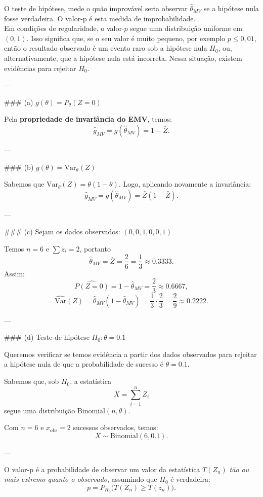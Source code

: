 \documentclass[a4paper]{article}
\begin{document}
\begin{answer}[]
O teste de hipótese, mede o quão improvável seria observar $\hat{\theta}_{MV}$ se a hipótese nula fosse verdadeira. O valor-p é esta medida de improbabilidade.
\\[1em]
Em condições de regularidade, o valor-$p$ segue uma distribuição uniforme em $(0,1)$.
Isso significa que, se o seu valor é muito pequeno, por exemplo $p \leq 0{,}01$,
então o resultado observado é um evento raro sob a hipótese nula $H_0$,
ou, alternativamente, que a hipótese nula está incorreta.
Nessa situação, existem evidências para rejeitar $H_0$.


---

### (a) \( g(\theta) = P_\theta(Z=0) \)

Pela \textbf{propriedade de invariância do EMV}, temos:
\[
\boxed{\hat{g}_{MV} = g(\hat{\theta}_{MV}) = 1 - \bar{Z}.}
\]

---

### (b) \( g(\theta) = \mathrm{Var}_\theta(Z) \)

Sabemos que \( \mathrm{Var}_\theta(Z) = \theta(1 - \theta) \).  
Logo, aplicando novamente a invariância:
\[
\boxed{\hat{g}_{MV} = g(\hat{\theta}_{MV}) = \bar{Z}(1 - \bar{Z}).}
\]

---

### (c) Sejam os dados observados: \( (0, 0, 1, 0, 0, 1) \)

Temos \( n = 6 \) e \( \sum z_i = 2 \), portanto
\[
\hat{\theta}_{MV} = \bar{Z} = \frac{2}{6} = \frac{1}{3} \approx 0.3333.
\]
Assim:
\[
\widehat{P(Z=0)} = 1 - \hat{\theta}_{MV} = \frac{2}{3} \approx 0.6667,
\]
\[
\widehat{\mathrm{Var}}(Z) = \hat{\theta}_{MV}(1 - \hat{\theta}_{MV})
= \frac{1}{3} \cdot \frac{2}{3} = \frac{2}{9} \approx 0.2222.
\]

---

### (d) Teste de hipótese \( H_0: \theta = 0.1 \)

Queremos verificar se temos evidência a partir dos dados observados para rejeitar a hipótese nula 
de que a probabilidade de sucesso é $\theta = 0.1$.

Sabemos que, sob $H_0$, a estatística
\[
X = \sum_{i=1}^{n} Z_i
\]
segue uma distribuição $\text{Binomial}(n, \theta)$.

Com $n = 6$ e $x_{\text{obs}} = 2$ sucessos observados, temos:
\[
X \sim \text{Binomial}(6, 0.1).
\]

---
 
O valor-p é a probabilidade de observar um valor da estatística $T(Z_n)$ 
\textit{tão ou mais extremo quanto o observado}, assumindo que $H_0$ é verdadeira:
\[
p = P_{H_0}\big(T(Z_n) \ge T(z_n)\big).
\]


\end{answer}
\end{document}
